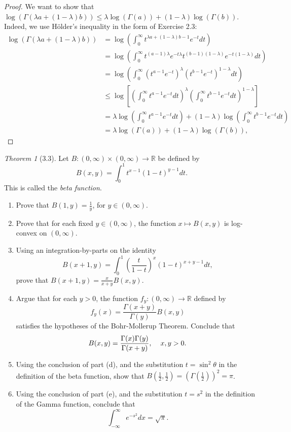 \documentclass[12pt]{article}
\theoremstyle{remark}
\theoremstyle{named}
\newtheorem*{theorem}{Theorem}
\newcommand{\R}{\mathbb R}
\newcommand{\infint}{\int_{-\infty}^{\infty}}
\newcommand{\g}{\Gamma}
\renewcommand{\l}{\lambda}
\begin{document}
\begin{proof}
    We want to show that \(\log(\g(\lambda a + (1 - \lambda) b)) \leq \l \log(\g(a)) + (1 - \l) \log(\g(b))\). Indeed, we use H\"older's inequality in the form of Exercise 2.3:
    \begin{align*}
        \log(\g(\lambda a + (1 - \lambda) b)) &= \log \left(\int_{0}^{\infty} t^{\l a + (1 - \l)b - 1} e^{-t} dt\right) \\
        &= \log \left(\int_{0}^{\infty} t^{(a - 1)\l} e^{-t\l}t^{(b - 1)(1 - \l)} e^{-t(1 - \l)} dt\right) \\
        &= \log \left(\int_{0}^{\infty} (t^{a - 1} e^{-t})^\l(t^{b - 1} e^{-t})^{1 - \l} dt\right) \\
        &\leq \log \left[\left(\int_{0}^{\infty}t^{a - 1}e^{-t} dt\right)^\l \left(\int_{0}^{\infty}t^{b - 1}e^{-t} dt\right)^{1 - \l}\right] \\
        &= \l \log \left(\int_{0}^{\infty}t^{a - 1}e^{-t} dt\right) + (1 - \l) \log \left(\int_{0}^{\infty}t^{b - 1}e^{-t} dt\right) \\
        &= \l \log(\g(a)) + (1 - \l) \log(\g(b)),
    \end{align*}
\end{proof}

\begin{theorem}[3.3]
    Let \(B : (0, \infty) \times (0, \infty) \to \R\) be defined by
    \[B(x, y) = \int_{0}^{1} t^{x - 1} (1 - t)^{y - 1} dt.\]
    This is called the \textit{beta function}.
    \begin{enumerate}
        \item Prove that \(B(1, y) = \frac{1}{y}\), for \(y \in (0, \infty)\).
        \item Prove that for each fixed \(y \in (0, \infty)\), the function \(x \mapsto B(x, y)\) is log-convex on \((0, \infty)\).
        \item Using an integration-by-parts on the identity
        \[B(x + 1, y) = \int_{0}^{1} \left(\frac{t}{1 - t}\right)^x ( 1- t)^{x + y - 1} dt,\]
        prove that \(B(x + 1, y) = \frac{x}{x + y} B(x, y)\).
        \item Argue that for each \(y > 0\), the function \(f_y : (0, \infty) \to \R\) defined by 
        \[f_y(x) = \frac{\g(x + y)}{\g(y)} B(x, y)\]
        satisfies the hypotheses of the Bohr-Mollerup Theorem. Conclude that 
        \[B(x, y) = \frac{\g(x)\g(y)}{\g(x + y)}, \hspace*{4mm} x, y > 0.\]
        \item Using the conclusion of part (d), and the substitution \(t = \sin^2 \theta\) in the definition of the beta function, show that \(B(\frac{1}{2}, \frac{1}{2}) = (\g(\frac{1}{2}))^2 = \pi\).
        \item Using the conclusion of part (e), and the substitution \(t = s^2\) in the definition of the Gamma function, conclude that 
        \[\infint e^{-s^2} dx = \sqrt{\pi}.\]
    \end{enumerate}
\end{theorem}
\end{document}
